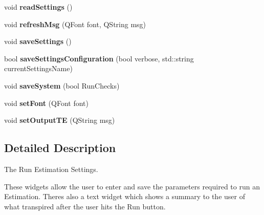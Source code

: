 \begin{DoxyCompactItemize}
\item 
void {\bfseries read\+Settings} ()\hypertarget{classnmf_estimation___tab6_aa851675904001978da6ce35298bf3012}{}\label{classnmf_estimation___tab6_aa851675904001978da6ce35298bf3012}

\item 
void {\bfseries refresh\+Msg} (Q\+Font font, Q\+String msg)\hypertarget{classnmf_estimation___tab6_a9d7c76dd70b2fc9a36beaaa4a4fb36d9}{}\label{classnmf_estimation___tab6_a9d7c76dd70b2fc9a36beaaa4a4fb36d9}

\item 
void {\bfseries save\+Settings} ()\hypertarget{classnmf_estimation___tab6_a7ad46555e85c23ffb9cc84c5446ffae9}{}\label{classnmf_estimation___tab6_a7ad46555e85c23ffb9cc84c5446ffae9}

\item 
bool {\bfseries save\+Settings\+Configuration} (bool verbose, std\+::string current\+Settings\+Name)\hypertarget{classnmf_estimation___tab6_ad8d3bd503e684ef029d1afc1040d36b5}{}\label{classnmf_estimation___tab6_ad8d3bd503e684ef029d1afc1040d36b5}

\item 
void {\bfseries save\+System} (bool Run\+Checks)\hypertarget{classnmf_estimation___tab6_a94d15864888d0148cc11b18c99a1a3bf}{}\label{classnmf_estimation___tab6_a94d15864888d0148cc11b18c99a1a3bf}

\item 
void {\bfseries set\+Font} (Q\+Font font)\hypertarget{classnmf_estimation___tab6_aec4866528626ed36cd4c393f94603247}{}\label{classnmf_estimation___tab6_aec4866528626ed36cd4c393f94603247}

\item 
void {\bfseries set\+Output\+TE} (Q\+String msg)\hypertarget{classnmf_estimation___tab6_afd007d6605c7b3d57b32f4c33ab82ced}{}\label{classnmf_estimation___tab6_afd007d6605c7b3d57b32f4c33ab82ced}

\end{DoxyCompactItemize}


\subsection{Detailed Description}
The Run Estimation Settings. 

These widgets allow the user to enter and save the parameters required to run an Estimation. There\textquotesingle{}s also a text widget which shows a summary to the user of what transpired after the user hits the Run button. 

